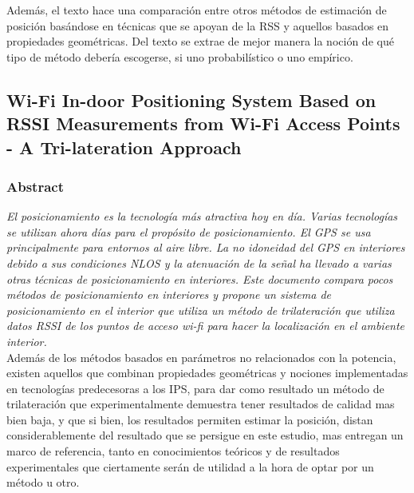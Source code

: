 Además, el texto hace una comparación entre otros métodos de estimación de posición basándose en técnicas que se apoyan de la \ac{RSS} y aquellos basados en propiedades geométricas. Del texto se extrae de mejor manera la noción de qué tipo de método debería escogerse, si uno probabilístico o uno empírico.

\subsection{Wi-Fi In-door Positioning System Based on RSSI Measurements from Wi-Fi Access Points - A Tri-lateration Approach}
\subsubsection{Abstract}	

\emph{El posicionamiento es la tecnología más atractiva hoy en día. Varias tecnologías se utilizan ahora días para el propósito de posicionamiento. El GPS se usa principalmente para entornos al aire libre. La no idoneidad del GPS en interiores debido a sus condiciones NLOS y la atenuación de la señal ha llevado a varias otras técnicas de posicionamiento en interiores. Este documento compara pocos métodos de posicionamiento en interiores y propone un sistema de posicionamiento en el interior que utiliza un método de trilateración que utiliza datos RSSI de los puntos de acceso wi-fi para hacer la localización en el ambiente interior.}\\

Además de los métodos basados en parámetros no relacionados con la potencia, existen aquellos que combinan propiedades geométricas y nociones implementadas en tecnologías predecesoras a los IPS, para dar como resultado un método de trilateración que experimentalmente demuestra tener resultados de calidad mas bien baja, y que si bien, los resultados permiten estimar la posición, distan considerablemente del resultado que se persigue en este estudio, mas entregan un marco de referencia, tanto en conocimientos teóricos y de resultados experimentales que ciertamente serán de utilidad a la hora de optar por un método u otro.


